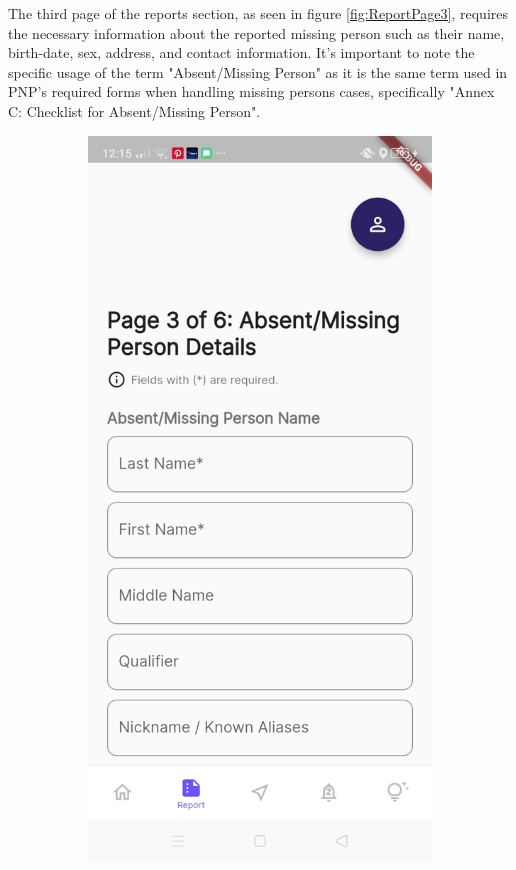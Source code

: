 The third page of the reports section, as seen in figure \ref{fig:ReportPage3}, requires the necessary information about the reported missing person such as their name, birth-date, sex, address, and contact information. It's important to note the specific usage of the term "Absent/Missing Person" as it is the same term used in PNP's required forms when handling missing persons cases, specifically "Annex C: Checklist for Absent/Missing Person".
\begin{figure}[!h]
    \centering
    \begin{subfigure}[c]{0.30\linewidth}
        \centering
        \includegraphics[scale=0.15]{figures/Chapter4/Main/p3-1.jpg}

\end{subfigure}
\end{figure}
